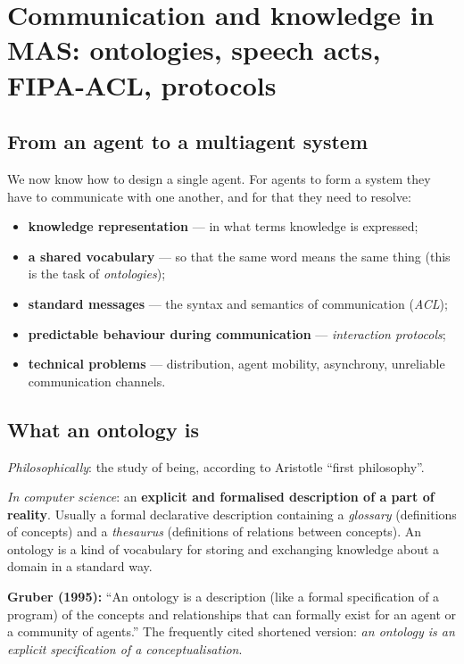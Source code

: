 \documentclass[11pt,a4paper]{article}
\theoremstyle{definition}
\providecommand{\uv}[1]{``#1''}
\begin{document}
\section{Communication and knowledge in MAS: ontologies, speech acts, FIPA-ACL, protocols}
\label{sec:komunikace}
\subsection{From an agent to a multiagent system}

We now know how to design a single agent. For agents to form a system they have to communicate with
one another, and for that they need to resolve:
\begin{itemize}
\item \textbf{knowledge representation} --- in what terms knowledge is expressed;
\item \textbf{a shared vocabulary} --- so that the same word means the same thing (this is the task of
  \emph{ontologies});
\item \textbf{standard messages} --- the syntax and semantics of communication (\emph{ACL});
\item \textbf{predictable behaviour during communication} --- \emph{interaction protocols};
\item \textbf{technical problems} --- distribution, agent mobility, asynchrony, unreliable
  communication channels.
\end{itemize}
\subsection{What an ontology is}

\begin{defbox}[Ontology]
\emph{Philosophically}: the study of being, according to Aristotle \uv{first philosophy}.

\emph{In computer science}: an \textbf{explicit and formalised description of a part of reality}.
Usually a formal declarative description containing a \emph{glossary} (definitions of concepts) and a
\emph{thesaurus} (definitions of relations between concepts). An ontology is a kind of vocabulary for
storing and exchanging knowledge about a domain in a standard way.

\textbf{Gruber (1995):} \uv{An ontology is a description (like a formal specification of a program) of
the concepts and relationships that can formally exist for an agent or a community of agents.}
The frequently cited shortened version: \emph{an ontology is an explicit specification of a
conceptualisation}.
\end{defbox}
\end{document}
